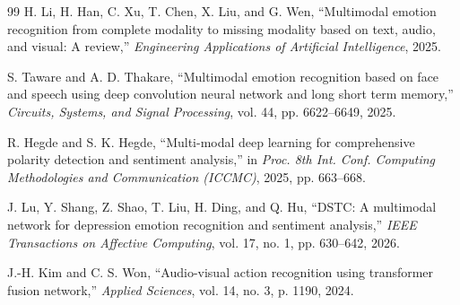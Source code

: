\documentclass[journal]{IEEEtran}
\begin{document}
\begin{thebibliography}{99}
H. Li, H. Han, C. Xu, T. Chen, X. Liu, and G. Wen, ``Multimodal emotion recognition from complete modality to missing modality based on text, audio, and visual: A review,'' \emph{Engineering Applications of Artificial Intelligence}, 2025. %

S. Taware and A. D. Thakare, ``Multimodal emotion recognition based on face and speech using deep convolution neural network and long short term memory,'' \emph{Circuits, Systems, and Signal Processing}, vol. 44, pp. 6622--6649, 2025.

R. Hegde and S. K. Hegde, ``Multi-modal deep learning for comprehensive polarity detection and sentiment analysis,'' in \emph{Proc. 8th Int. Conf. Computing Methodologies and Communication (ICCMC)}, 2025, pp. 663--668.

J. Lu, Y. Shang, Z. Shao, T. Liu, H. Ding, and Q. Hu, ``DSTC: A multimodal network for depression emotion recognition and sentiment analysis,'' \emph{IEEE Transactions on Affective Computing}, vol. 17, no. 1, pp. 630--642, 2026.

J.-H. Kim and C. S. Won, ``Audio-visual action recognition using transformer fusion network,'' \emph{Applied Sciences}, vol. 14, no. 3, p. 1190, 2024.

\end{thebibliography}

% 


\end{document}
